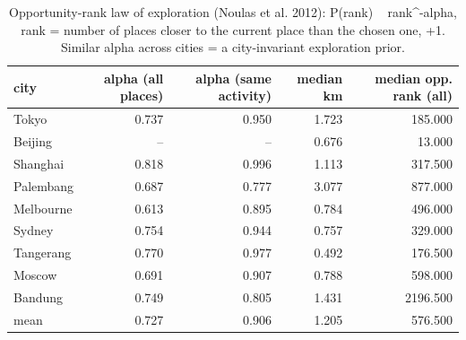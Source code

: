 \begin{table}[t]
\centering\small
\caption{Opportunity-rank law of exploration (Noulas et al. 2012): P(rank) ~ rank^-alpha, rank = number of places closer to the current place than the chosen one, +1.  Similar alpha across cities = a city-invariant exploration prior.}
\label{tab:A8_rank_law}
\begin{tabular}{lrrrr}
\toprule
city & alpha (all places) & alpha (same activity) & median km & median opp. rank (all) \\
\midrule
Tokyo & 0.737 & 0.950 & 1.723 & 185.000 \\
Beijing & -- & -- & 0.676 & 13.000 \\
Shanghai & 0.818 & 0.996 & 1.113 & 317.500 \\
Palembang & 0.687 & 0.777 & 3.077 & 877.000 \\
Melbourne & 0.613 & 0.895 & 0.784 & 496.000 \\
Sydney & 0.754 & 0.944 & 0.757 & 329.000 \\
Tangerang & 0.770 & 0.977 & 0.492 & 176.500 \\
Moscow & 0.691 & 0.907 & 0.788 & 598.000 \\
Bandung & 0.749 & 0.805 & 1.431 & 2196.500 \\
mean & 0.727 & 0.906 & 1.205 & 576.500 \\
\bottomrule
\end{tabular}
\end{table}
